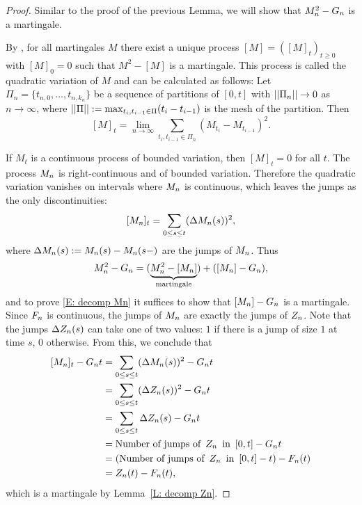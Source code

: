 \begin{proof} \label{P: decomp Mn}
	Similar to the proof of the previous Lemma, we will show that $M_n^2 - G_n$ is a martingale.
	
	By \cite[Theorem 21.70, p.471]{Klenke2013}, 
	for all martingales $M$ there exist a unique process $[M] = ([M]_t)_{t\geq 0}$ with $[M]_0 = 0$ such that
	$M^2 - [M]$	is a martingale.
	This process is called the quadratic variation of $M$ and can be calculated as follows:
	Let $\Pi_n = \{ t_{n,0}, \dots, t_{n,k_n} \}$ be a sequence of partitions of $[0,t]$
	with $||\Pi_n|| \rightarrow 0$ as $n \rightarrow \infty$, 
	where $||\Pi|| := \max_{t_i, t_{i-1} \in \Pi} (t_i - t_{i-1})$ is the mesh of the partition.
	Then
	\begin{equation} \label{E: def quadratic variation}
		[M]_t = \lim_{n \rightarrow \infty} \sum_{t_i, t_{i-1} \in \Pi_n}(M_{t_i} - M_{t_{i-1}})^2.
	\end{equation}
	
	If $M_t$ is a continuous process of bounded variation, then $[M]_t = 0$ for all $t$.
	The process $M_n$ is right-continuous and of bounded variation.
	Therefore the quadratic variation vanishes on intervals where $M_n$ is continuous, 
	which leaves the jumps as the only discontinuities:
	\begin{equation}
	[M_n]_{t} = \sum_{0 \leq s \leq t} (\Delta M_n(s))^2,
	\end{equation}
	where $\Delta M_n(s) := M_n(s) - M_n(s-)$ are the jumps of $M_n$.
	Thus
	\begin{equation}
	M_n^2 - G_n = (\underbrace{M_n^2 - [M_n]}_{\text{martingale}}) + ([M_n] - G_n),
	\end{equation}
	and to prove \eqref{E: decomp Mn} it suffices to show that $[M_n] - G_n$ is a martingale.
	Since $F_n$ is continuous, the jumps of $M_n$ are exactly the jumps of $Z_n$.
	Note that the jumps $\Delta Z_n(s)$ can take one of two values: 
	$1$ if there is a jump of size $1$ at time $s$, 0 otherwise.
	From this, we conclude that
	\begin{align*}
	[M_n]_{t} - G_n{t}
	&= \sum_{0 \leq s \leq t} (\Delta M_n(s))^2 - G_n{t} \\
	&= \sum_{0 \leq s \leq t} (\Delta Z_n(s))^2 - G_n{t} \\
	&= \sum_{0 \leq s \leq t} \Delta Z_n(s) - G_n{t} \\
	&= \text{Number of jumps of} \enspace Z_n \enspace \text{in} \enspace [0,t] - G_n{t} \\
	&= (\text{Number of jumps of} \enspace Z_n \enspace \text{in} \enspace [0,t] - t) - F_n(t) \\
	&= Z_n(t) - F_n(t),
	\end{align*}
	which is a martingale by Lemma~\ref{L: decomp Zn}.
\end{proof}



